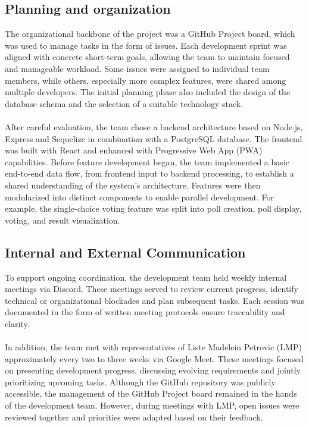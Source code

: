 \documentclass[a4paper,12pt]{report}
\begin{document}
\subsection{Planning and organization}
The organizational backbone of the project was a GitHub Project board, which was used to manage tasks in the form of issues. Each development sprint was aligned with concrete short-term goals, allowing the team to maintain focused and manageable workload. Some issues were assigned to individual team members, while others, especially more complex features, were shared among multiple developers. The initial planning phase also included the design of the database schema and the selection of a suitable technology stack.\\\\
After careful evaluation, the team chose a backend architecture based on Node.js, Express and Sequelize in combination with a PostgreSQL database. The frontend was built with React and enhanced with Progressive Web App (PWA) capabilities. Before feature development began, the team implemented a basic end-to-end data flow, from frontend input to backend processing, to establish a shared understanding of the system's architecture. Features were then modularized into distinct components to enable parallel development. For example, the single-choice voting feature was split into poll creation, poll display, voting, and result visualization. \\

\subsection{Internal and External Communication}
To support ongoing coordination, the development team held weekly internal meetings via Discord. These meetings served to review current progress, identify technical or organizational blockades and plan subsequent tasks. Each session was documented in the form of written meeting protocols ensure traceability and clarity.\\\\
In addition, the team met with representatives of Liste Madelein Petrovic (LMP) approximately every two to three weeks via Google Meet. These meetings focused on presenting development progress, discussing evolving requirements and jointly prioritizing upcoming tasks. Although the GitHub repository was publicly accessible, the management of the GitHub Project board remained in the hands of the development team. However, during meetings with LMP, open issues were reviewed together and priorities were adapted based on their feedback. \\
\end{document}
